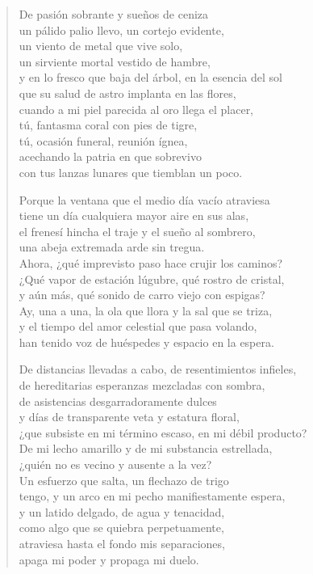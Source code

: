 \documentclass[12pt]{article}
\begin{document}
\clearpage
{}
\begin{verse}

De pasión sobrante y sueños de ceniza\\
un pálido palio llevo, un cortejo evidente,\\
un viento de metal que vive solo,\\
un sirviente mortal vestido de hambre,\\
y en lo fresco que baja del árbol, en la esencia del sol\\
que su salud de astro implanta en las flores,\\
cuando a mi piel parecida al oro llega el placer,\\
tú, fantasma coral con pies de tigre,\\
tú, ocasión funeral, reunión ígnea,\\
acechando la patria en que sobrevivo\\
con tus lanzas lunares que tiemblan un poco.  

Porque la ventana que el medio día vacío atraviesa\\
tiene un día cualquiera mayor aire en sus alas,\\
el frenesí hincha el traje y el sueño al sombrero,\\
una abeja extremada arde sin tregua.\\
Ahora, ¿qué imprevisto paso hace crujir los caminos?\\
¿Qué vapor de estación lúgubre, qué rostro de cristal,\\
y aún más, qué sonido de carro viejo con espigas?\\
Ay, una a una, la ola que llora y la sal que se triza,\\
y el tiempo del amor celestial que pasa volando,\\
han tenido voz de huéspedes y espacio en la espera.  

De distancias llevadas a cabo, de resentimientos infieles,\\
de hereditarias esperanzas mezcladas con sombra,\\
de asistencias desgarradoramente dulces\\
y días de transparente veta y estatura floral,\\
¿que subsiste en mi término escaso, en mi débil producto?\\
De mi lecho amarillo y de mi substancia estrellada,\\
¿quién no es vecino y ausente a la vez?\\
Un esfuerzo que salta, un flechazo de trigo\\
tengo, y un arco en mi pecho manifiestamente espera,\\
y un latido delgado, de agua y tenacidad,\\
como algo que se quiebra perpetuamente,\\
atraviesa hasta el fondo mis separaciones,\\
apaga mi poder y propaga mi duelo.

\end{verse}
\end{document}
